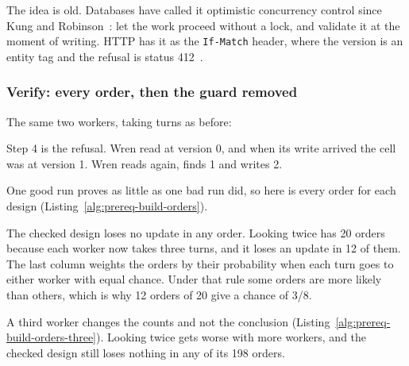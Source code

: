 
The idea is old. Databases have called it optimistic concurrency control
since Kung and Robinson~: let the work proceed
without a lock, and validate it at the moment of writing. HTTP has it as
the \texttt{If-Match} header, where the version is an entity tag and the
refusal is status 412~.

\subsubsection{Verify: every order, then the guard removed}

The same two workers, taking turns as before:


Step 4 is the refusal. Wren read at version 0, and when its write arrived
the cell was at version 1. Wren reads again, finds 1 and writes 2.

One good run proves as little as one bad run did, so here is every order
for each design (Listing~\ref{alg:prereq-build-orders}).


The checked design loses no update in any order. Looking twice has 20
orders because each worker now takes three turns, and it loses an update in
12 of them. The last column weights the orders by their probability when
each turn goes to either worker with equal chance. Under that rule some
orders are more likely than others, which is why 12 orders of 20 give a
chance of 3/8.

A third worker changes the counts and not the conclusion
(Listing~\ref{alg:prereq-build-orders-three}). Looking twice gets worse with
more workers, and the checked design still loses nothing in any of its 198
orders.

